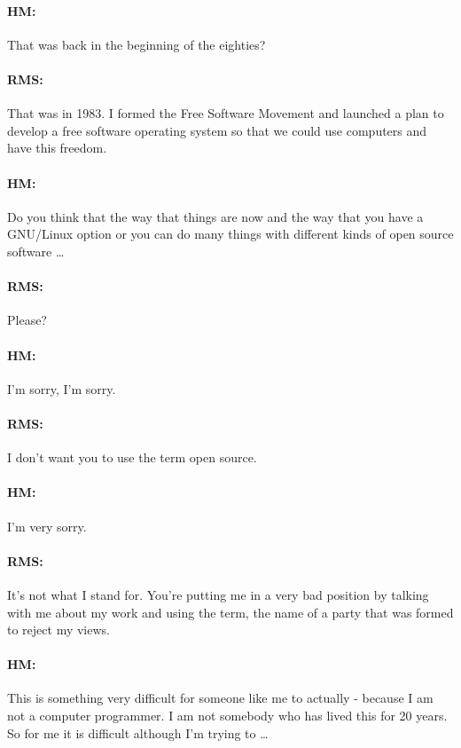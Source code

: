 \paragraph{HM:}{That was back in the beginning of the eighties?}

\paragraph{RMS:}{That was in 1983. I formed the Free Software Movement and
launched a plan to develop a free software operating system so that we could use
computers and have this freedom.}

\paragraph{HM:}{Do you think that the way that things are now and the way that
you have a GNU/Linux option or you can do many things with dif\hbox{}ferent
kinds of open source software \dots}

\paragraph{RMS:}{Please?}

\paragraph{HM:}{I'm sorry, I'm sorry.}

\paragraph{RMS:}{I don't want you to use the term open source.}

\paragraph{HM:}{I'm very sorry.}

\paragraph{RMS:}{It's not what I stand for. You're putting me in a very bad
position by talking with me about my work and using the term, the name of a
party that was formed to reject my views.}

\paragraph{HM:}{This is something very dif\hbox{}f\hbox{}icult for someone like
me to actually - because I am not a computer programmer. I am not somebody who
has lived this for 20 years. So for me it is dif\hbox{}f\hbox{}icult although
I'm trying to \dots}

